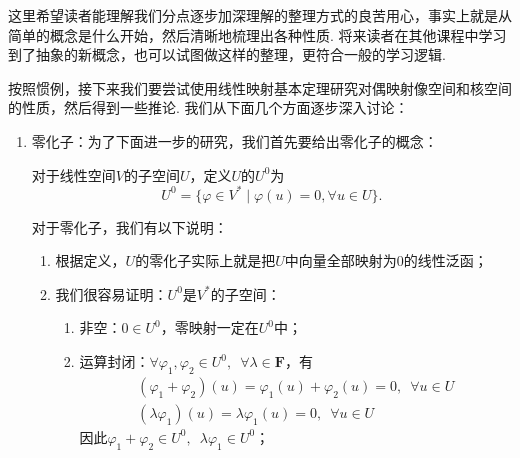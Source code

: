 这里希望读者能理解我们分点逐步加深理解的整理方式的良苦用心，事实上就是从简单的概念是什么开始，然后清晰地梳理出各种性质. 将来读者在其他课程中学习到了抽象的新概念，也可以试图做这样的整理，更符合一般的学习逻辑.

按照惯例，接下来我们要尝试使用线性映射基本定理研究对偶映射像空间和核空间的性质，然后得到一些推论. 我们从下面几个方面逐步深入讨论：
\begin{enumerate}
    \item 零化子：为了下面进一步的研究，我们首先要给出零化子的概念：
          \begin{definition}[零化子] 
              对于线性空间$V$的子空间$U$，定义$U$的$U^0$为
              \[U^0=\{\varphi\in V^*\mid\varphi(u)=0,\forall u\in U\}.\]
          \end{definition}

          对于零化子，我们有以下说明：
          \begin{enumerate}
              \item 根据定义，$U$的零化子实际上就是把$U$中向量全部映射为0的线性泛函；

              \item 我们很容易证明：$U^0$是$V^*$的子空间：
                    \begin{enumerate}
                        \item 非空：$0\in U^0$，零映射一定在$U^0$中；

                        \item 运算封闭：$\forall\varphi_1,\varphi_2\in U^0,\enspace \forall\lambda\in\mathbf{F}$，有
                              \begin{gather*}
                                  (\varphi_1+\varphi_2)(u)=\varphi_1(u)+\varphi_2(u)=0,\enspace\forall u\in U \\
                                  (\lambda\varphi_1)(u)=\lambda\varphi_1(u)=0,\enspace\forall u\in U
                              \end{gather*}
                              因此$\varphi_1+\varphi_2\in U^0,\enspace \lambda\varphi_1\in U^0$；
                    \end{enumerate}


\end{enumerate}
\end{enumerate}
